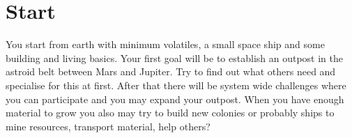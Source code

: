 \section{Start}

You start from earth with minimum volatiles, a small space ship and some building and living basics. 
Your first goal will be to establish an outpost in the astroid belt between Mars and
Jupiter. Try to find out what others need and specialise for this at first. After
that there will be system wide challenges where you can participate and you may expand
your outpost. When you have enough material to grow you also may try to build new colonies or
probably ships to mine resources, transport material, help others? 

